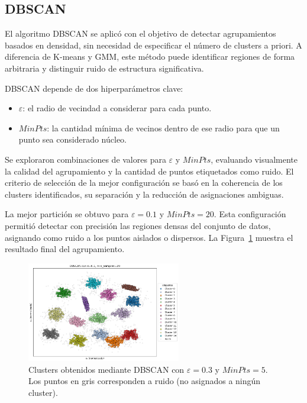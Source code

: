 \documentclass[11pt]{article}
\begin{document}
\subsection*{DBSCAN}

El algoritmo DBSCAN se aplicó con el objetivo de detectar agrupamientos basados en densidad, sin necesidad de especificar el número de clusters a priori. A diferencia de K-means y GMM, este método puede identificar regiones de forma arbitraria y distinguir ruido de estructura significativa.

DBSCAN depende de dos hiperparámetros clave:

\begin{itemize}
    \item $\varepsilon$: el radio de vecindad a considerar para cada punto.
    \item $MinPts$: la cantidad mínima de vecinos dentro de ese radio para que un punto sea considerado núcleo.
\end{itemize}

Se exploraron combinaciones de valores para $\varepsilon$ y $MinPts$, evaluando visualmente la calidad del agrupamiento y la cantidad de puntos etiquetados como ruido. El criterio de selección de la mejor configuración se basó en la coherencia de los clusters identificados, su separación y la reducción de asignaciones ambiguas.

La mejor partición se obtuvo para $\varepsilon = 0.1$ y $MinPts = 20$. Esta configuración permitió detectar con precisión las regiones densas del conjunto de datos, asignando como ruido a los puntos aislados o dispersos. La Figura~\ref{fig:dbscan_clusters} muestra el resultado final del agrupamiento.

\begin{figure}[H]
    \centering
    \includegraphics[width=0.6\textwidth]{figures/dbscan_clusters.png}
    \caption{Clusters obtenidos mediante DBSCAN con $\varepsilon = 0.3$ y $MinPts = 5$. Los puntos en gris corresponden a ruido (no asignados a ningún cluster).}
    \label{fig:dbscan_clusters}
\end{figure}
\end{document}
